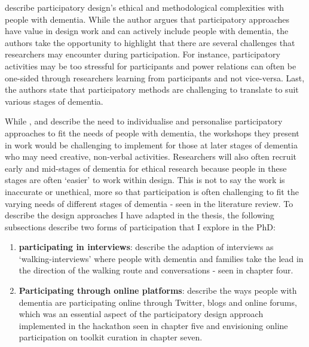 \cite{hendriks_challenges_2014} describe participatory design's ethical and methodological complexities with people with dementia. While the author argues that participatory approaches have value in design work and can actively include people with dementia, the authors take the opportunity to highlight that there are several challenges that researchers may encounter during participation. For instance, participatory activities may be too stressful for participants and power relations can often be one-sided through researchers learning from participants and not vice-versa. Last, the authors state that participatory methods are challenging to translate to suit various stages of dementia.

While \cite{lindsay_empathy_2012}, and \cite{stenhouse2013dangling} describe the need to individualise and personalise participatory approaches to fit the needs of people with dementia, the workshops they present in work would be challenging to implement for those at later stages of dementia who may need creative, non-verbal activities. Researchers will also often recruit early and mid-stages of dementia for ethical research because people in these stages are often ‘easier’ to work within design. This is not to say the work is inaccurate or unethical, more so that participation is often challenging to fit the varying needs of different stages of dementia - seen in the literature review. To describe the design approaches I have adapted in the thesis, the following subsections describe two forms of participation that I explore in the PhD: 
\begin{enumerate}

\item \textbf{participating in interviews}: describe the adaption of interviews as `walking-interviews' where people with dementia and families take the lead in the direction of the walking route and conversations
- seen in chapter four.

\item \textbf{Participating through online platforms}: describe the ways people with dementia are participating online through Twitter, blogs and online forums, which was an essential aspect of the participatory design approach implemented in the hackathon seen in chapter five and envisioning online participation on toolkit curation in chapter seven.
 
\end{enumerate}

